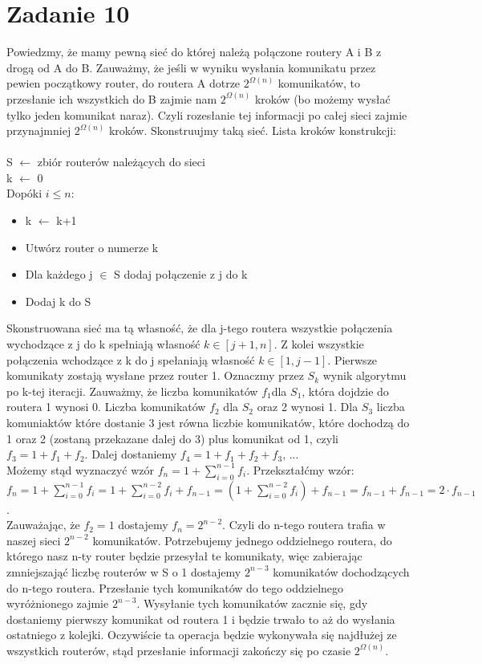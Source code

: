 \documentclass[11pt,wide]{article}
\begin{document}
\section{Zadanie 10}
Powiedzmy, że mamy pewną sieć do której należą połączone routery A i B z drogą od A do B. Zauważmy, że jeśli w wyniku wysłania komunikatu przez pewien początkowy router, do routera A dotrze $2^{\Omega (n)}$ komunikatów, to przesłanie ich wszystkich do B zajmie nam $2^{\Omega (n)}$ kroków (bo możemy wysłać tylko jeden komunikat naraz). Czyli rozesłanie tej informacji po całej sieci zajmie przynajmniej $2^{\Omega (n)}$ kroków. Skonstruujmy taką sieć. Lista kroków konstrukcji:\\\\
S $\leftarrow$ zbiór routerów należących do sieci \\
k $\leftarrow$ 0 \\
Dopóki $i \leq n$:
\begin{itemize}
\item k $\leftarrow$ k+1
\item Utwórz router o numerze k
\item Dla każdego j $\in$ S dodaj połączenie z j do k
\item Dodaj k do S
\end{itemize}
Skonstruowana sieć ma tą własność, że dla j-tego routera wszystkie połączenia wychodzące z j do k spełniają własność $k \in [j+1, n]$. Z kolei wszystkie połączenia wchodzące z k do j spełaniają własność $k \in [1, j-1]$. Pierwsze komunikaty zostają wysłane przez router 1.
Oznaczmy przez $S_k$ wynik algorytmu po k-tej iteracji. Zauważmy, że liczba komunikatów $f_1 $dla $S_1$, która dojdzie do routera 1 wynosi 0. Liczba komunikatów $f_2$ dla $S_2$ oraz 2 wynosi 1. Dla $S_3$ liczba komuniaktów które dostanie 3 jest równa liczbie komunikatów, które dochodzą do 1 oraz 2 (zostaną przekazane dalej do 3) plus komunikat od 1, czyli $f_3 = 1 + f_1 + f_2$. Dalej dostaniemy $f_4 = 1 + f_1 + f_2 + f_3$, ... \\
Możemy stąd wyznaczyć wzór $f_n = 1 + \sum_{i=0}^{n-1} f_i$. Przekształćmy wzór:\\
\( f_n = 1 + \sum_{i=0}^{n-1} f_i = 1 + \sum_{i=0}^{n-2} f_i + f_{n-1} = (1 + \sum_{i=0}^{n-2} f_i) + f_{n-1} = f_{n-1} + f_{n-1} = 2\cdot f_{n-1} \).\\
Zauważając, że $f_2 = 1$ dostajemy $f_{n} = 2^{n-2}$. Czyli do n-tego routera trafia w naszej sieci $2^{n-2}$ komunikatów.
Potrzebujemy jednego oddzielnego routera, do którego nasz n-ty router będzie przesyłał te komunikaty, więc zabierając zmniejszająć liczbę routerów w S o 1 dostajemy $2^{n-3}$ komunikatów dochodzących do n-tego routera. Przesłanie tych komunikatów do tego oddzielnego wyróżnionego zajmie $2^{n-3}$. Wysyłanie tych komunikatów zacznie się, gdy dostaniemy pierwszy komunikat od routera 1 i będzie trwało to aż do wysłania ostatniego z kolejki. Oczywiście ta operacja będzie wykonywała się najdłużej ze wszystkich routerów, stąd przesłanie informacji zakończy się po czasie $2^{\Omega (n)}$.
\end{document}
